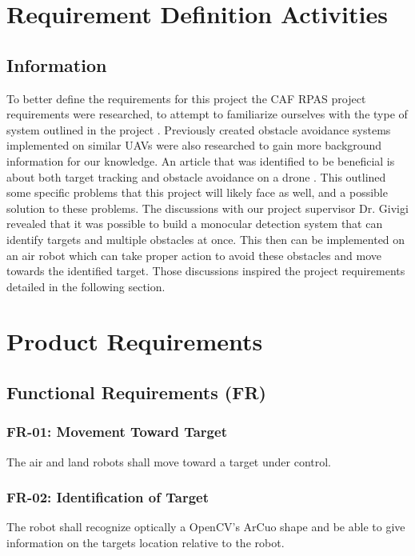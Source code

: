 \documentclass{article}
\begin{document}
\section{Requirement Definition Activities}

	\subsection{Information}
	
	To better define the requirements for this project the CAF RPAS project requirements were researched, to attempt to familiarize ourselves with the type of system outlined in the project \cite{RPAS}. Previously created obstacle avoidance systems implemented on similar UAVs were also researched to gain more background information for our knowledge. An article that was identified to be beneficial is about both target tracking and obstacle avoidance on a drone \cite{woods2015dynamic}. This outlined some specific problems that this project will likely face as well, and a possible solution to these problems. 
	The discussions with our project supervisor Dr. Givigi revealed that it was possible to build a monocular detection system that can identify targets and multiple obstacles at once. This then can be implemented on an air robot which can take proper action to avoid these obstacles and move towards the identified target. Those discussions inspired the project requirements detailed in the following section.

\section{Product Requirements}

	\subsection{Functional Requirements (FR)}
		
		\subsubsection{FR-01: Movement Toward Target}
		The air and land robots shall move toward a target under control.
		
		\subsubsection{FR-02: Identification of Target}
		The robot shall recognize optically a OpenCV's ArCuo shape and be able to give information on the targets location relative to the robot. 
\end{document}
